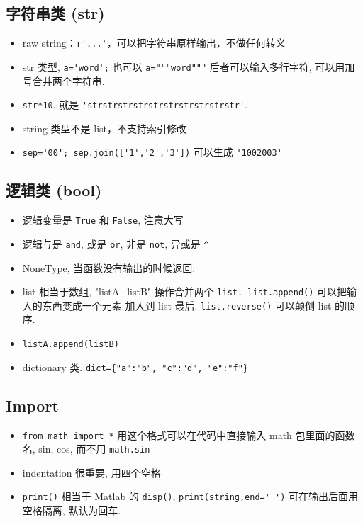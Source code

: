 \subsection{字符串类 (str)}
\begin{itemize}
\item raw string：\verb`r'...'`，可以把字符串原样输出，不做任何转义
\item str 类型, \verb`a='word';` 也可以 \verb`a="""word"""` 后者可以输入多行字符, 可以用加号合并两个字符串.
\item \verb`str*10`, 就是 \verb`'strstrstrstrstrstrstrstrstrstr'`.
\item string 类型不是 list，不支持索引修改
\item \verb`sep='00'; sep.join(['1','2','3'])` 可以生成 \verb`'1002003'`
\end{itemize}

\subsection{逻辑类 (bool)}
\begin{itemize}
\item 逻辑变量是 \verb`True` 和 \verb`False`, 注意大写
\item 逻辑与是 \verb`and`, 或是 \verb`or`, 非是 \verb`not`, 异或是 \verb`^`
\item NoneType, 当函数没有输出的时候返回.
\item list 相当于数组, "listA+listB" 操作合并两个 \verb`list. list.append()` 可以把输入的东西变成一个元素
    加入到 list 最后.  \verb`list.reverse()` 可以颠倒 list 的顺序.
\item \verb`listA.append(listB)`
\item dictionary 类.  \verb`dict={"a":"b", "c":"d", "e":"f"}`
\end{itemize}

\subsection{Import}
\begin{itemize}
\item \verb`from math import *` 用这个格式可以在代码中直接输入 math 包里面的函数名, sin, cos, 而不用 \verb`math.sin`
\item indentation 很重要, 用四个空格
\item \verb`print()` 相当于 Matlab 的 \verb`disp()`, \verb`print(string,end=' ')` 可在输出后面用空格隔离, 默认为回车. 
\end{itemize}

